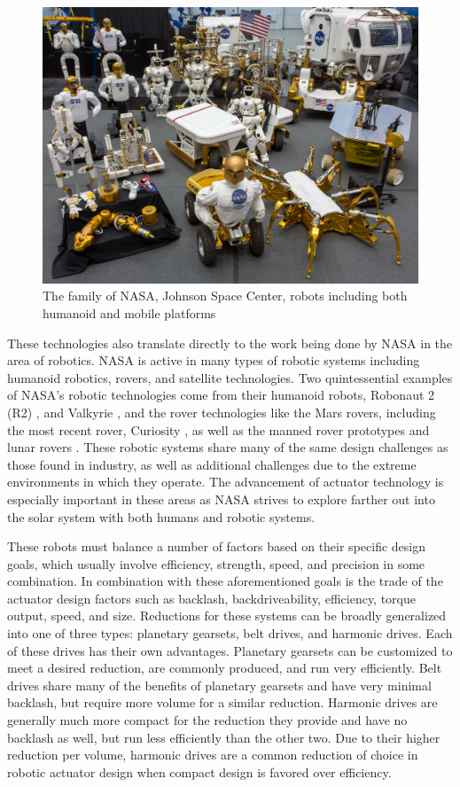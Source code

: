 \begin{figure}[!b]
   \centering
   \includegraphics[width=0.7\linewidth]{fig/robot_collage}
   \caption{The family of NASA, Johnson Space Center, robots including both humanoid and mobile platforms}
   \label{fig/robot_collage}
\end{figure}

These technologies also translate directly to the work being done by NASA in the area of robotics. 
NASA is active in many types of robotic systems including humanoid robotics, rovers, and satellite technologies. 
Two quintessential examples of NASA's robotic technologies come from their humanoid robots, Robonaut 2 (R2) \cite{ref:r2}, and Valkyrie \cite{ref:valkyrie}, and the rover technologies like the Mars rovers, including the most recent rover, Curiosity \cite{ref:curiosity}, as well as the manned rover prototypes \cite{ref:rover} and lunar rovers \cite{ref:RP}.
These robotic systems share many of the same design challenges as those found in industry, as well as additional challenges due to the extreme environments in which they operate. The advancement of actuator technology is especially important in these areas as NASA strives to explore farther out into the solar system with both humans and robotic systems. 

These robots must balance a number of factors based on their specific design goals, which usually involve efficiency, strength, speed, and precision in some combination. 
In combination with these aforementioned goals is the trade of the actuator design factors such as backlash, backdriveability, efficiency, torque output, speed, and size. 
Reductions for these systems can be broadly generalized into one of three types: planetary gearsets, belt drives, and harmonic drives. 
Each of these drives has their own advantages. 
Planetary gearsets can be customized to meet a desired reduction, are commonly produced, and run very efficiently.
Belt drives share many of the benefits of planetary gearsets and have very minimal backlash, but require more volume for a similar reduction. 
Harmonic drives are generally much more compact for the reduction they provide and have no backlash as well, but run less efficiently than the other two. 
Due to their higher reduction per volume, harmonic drives are a common reduction of choice in robotic actuator design when compact design is favored over efficiency.

